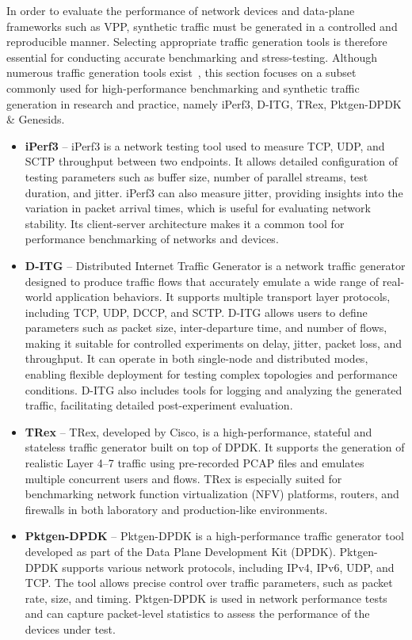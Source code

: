 In order to evaluate the performance of network devices and data-plane frameworks such as VPP, synthetic traffic must be generated in a controlled and reproducible manner. 
Selecting appropriate traffic generation tools is therefore essential for conducting accurate benchmarking and stress-testing. Although numerous traffic generation tools exist~\cite{traffic-generators}, 
this section focuses on a subset commonly used for high-performance benchmarking and synthetic traffic generation in research and practice, namely iPerf3, D-ITG, TRex, Pktgen-DPDK \& Genesids. 

\begin{itemize}
  \item \textbf{iPerf3} -- iPerf3 is a network testing tool used to measure TCP, UDP, and SCTP throughput between two endpoints. It allows detailed configuration of testing parameters such as buffer size, number of parallel streams, test duration, and jitter. iPerf3 can also measure jitter, providing insights into the variation in packet arrival times, which is useful for evaluating network stability. Its client-server architecture makes it a common tool for performance benchmarking of networks and devices.~\cite{iperf}

  \item \textbf{D-ITG} -- Distributed Internet Traffic Generator is a network traffic generator designed to produce traffic flows that accurately emulate a wide range of real-world application behaviors. It supports multiple transport layer protocols, including TCP, UDP, DCCP, and SCTP. D-ITG allows users to define parameters such as packet size, inter-departure time, and number of flows, making it suitable for controlled experiments on delay, jitter, packet loss, and throughput. It can operate in both single-node and distributed modes, enabling flexible deployment for testing complex topologies and performance conditions. D-ITG also includes tools for logging and analyzing the generated traffic, facilitating detailed post-experiment evaluation.~\cite{DITGManual}

  \item \textbf{TRex} -- TRex, developed by Cisco, is a high-performance, stateful and stateless traffic generator built on top of DPDK. It supports the generation of realistic Layer 4–7 traffic using pre-recorded PCAP files and emulates multiple concurrent users and flows. TRex is especially suited for benchmarking network function virtualization (NFV) platforms, routers, and firewalls in both laboratory and production-like environments.~\cite{trex} 

\item \textbf{Pktgen-DPDK} -- Pktgen-DPDK is a high-performance traffic generator tool developed as part of the Data Plane Development Kit (DPDK). Pktgen-DPDK supports various network protocols, including IPv4, IPv6, UDP, and TCP. The tool allows precise control over traffic parameters, such as packet rate, size, and timing. Pktgen-DPDK is used in network performance tests and can capture packet-level statistics to assess the performance of the devices under test.~\cite{pktgen_dpdk} 
\end{itemize}

